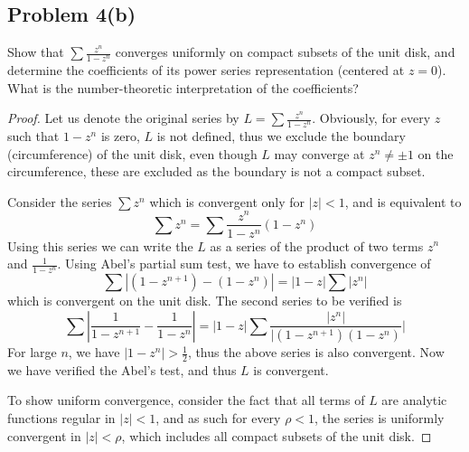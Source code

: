 \documentclass{article}[12pt]
\newtheorem{proof}{Proof}
\begin{document}
\subsection*{Problem 4(b)}Show that $\sum \frac{z^n}{1-z^n}$ converges
uniformly on compact subsets of the unit disk, and determine the
coefficients of its power series representation (centered at $z=0$).
What is the number-theoretic interpretation of the coefficients?
\begin{proof}
Let us denote the original series by $L=\sum \frac{z^n}{1-z^n}$.
Obviously, for every $z$ such that $1-z^n$ is zero, $L$ is
not defined, thus we exclude the boundary (circumference) of the
unit disk, even though $L$ may converge at $z^n\ne \pm 1$ on the
circumference, these are excluded as the boundary is not a compact
subset.

Consider the series $\sum z^n$ which is convergent only for $|z|<1$,
and is equivalent to 
\[
\sum z^n = \sum \frac{z^n}{1-z^n} (1-z^n)
\]
Using this series we can write the $L$ as a series of the product
of two terms $z^n$ and $\frac{1}{1-z^n}$.
Using Abel's partial sum test, we have to establish convergence of
\[
\sum |(1-z^{n+1})-(1-z^n)| = |1-z|\sum |z^n|
\]
which is convergent on the unit disk.
The second series to be verified is
\[
\sum |\frac{1}{1-z^{n+1}} - \frac{1}{1-z^n}| = |1-z|\sum 
\frac{|z^n|}{|(1-z^{n+1})(1-z^n)}|
\]
For large $n$, we have $|1-z^n|>\frac{1}{2}$, thus the above series
is also convergent. Now we have verified the Abel's test, and thus
$L$ is convergent.

To show uniform convergence, consider the fact that all terms of $L$
are analytic functions regular in $|z|<1$, and as such for every $\rho < 1$, 
the series is uniformly convergent in $|z|<\rho$, which includes all
compact subsets of the unit disk.


\end{proof}
\end{document}
